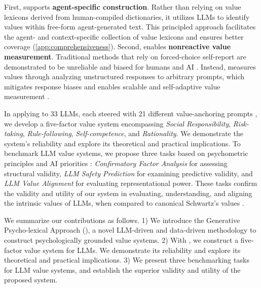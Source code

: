 First, \our{} supports \textbf{agent-specific construction}. Rather than relying on value lexicons derived from human-compiled dictionaries, it utilizes LLMs to identify values within free-form agent-generated text. This principled approach facilitates the agent- and context-specific collection of value lexicons and ensures better coverage (\cref{app:comprehensiveness}).
Second, \our{} enables \textbf{nonreactive value measurement}. Traditional methods that rely on forced-choice self-report are demonstrated to be unreliable and biased for humans \cite{ponizovskiy2020development, bardi2008new} and AI \cite{ye2025gpv, rottger2024political, dominguez2023questioning}. Instead, \our{} measures values through analyzing unstructured responses to arbitrary prompts, which mitigates response biases and enables scalable and self-adaptive value measurement \cite{ye2025gpv}.

In applying \our{} to 33 LLMs, each steered with 21 different value-anchoring prompts \cite{rozen2024llms}, we develop a five-factor value system encompassing \textit{Social Responsibility}, \textit{Risk-taking}, \textit{Rule-following}, \textit{Self-competence}, and \textit{Rationality}. We demonstrate the system's reliability and explore its theoretical and practical implications. To benchmark LLM value systems, we propose three tasks based on psychometric principles \cite{devon2007psychometric} and AI priorities \cite{ji2023ai_alignment, anwar2024foundational}: \textit{Confirmatory Factor Analysis} for assessing structural validity, \textit{LLM Safety Prediction} for examining predictive validity, and \textit{LLM Value Alignment} for evaluating representational power. These tasks confirm the validity and utility of our system in evaluating, understanding, and aligning the intrinsic values of LLMs, when compared to canonical Schwartz's values \cite{schwartz2012overview}.

We summarize our contributions as follows. 1) We introduce the Generative Psycho-lexical Approach (\our{}), a novel LLM-driven and data-driven methodology to construct psychologically grounded value systems. 2) With \our{}, we construct a five-factor value system for LLMs. We demonstrate its reliability and explore its theoretical and practical implications. 3) We present three benchmarking tasks for LLM value systems, and establish the superior validity and utility of the proposed system.
